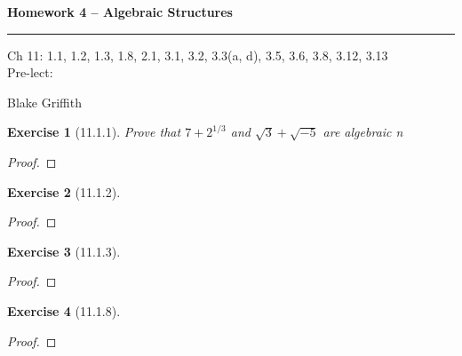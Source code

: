 \documentclass[12pt]{article}
\newtheorem*{exer}{Exercise}
\begin{document}
\textbf{Homework 4 -- Algebraic Structures} \\

\hrule

\begin{minipage}{.80\linewidth}
    \flushleft
    Ch 11: 1.1, 1.2, 1.3, 1.8, 2.1, 3.1, 3.2, 3.3(a, d), 3.5, 3.6, 3.8,
    3.12, 3.13 \\
    Pre-lect:  \\
\end{minipage}
\begin{minipage}{.20\linewidth}
    \flushright
    Blake Griffith
\end{minipage}


\begin{exer}[11.1.1]

    Prove that $7 + 2^{1/3}$ and $\sqrt{3} + \sqrt{-5}$ are algebraic n
\end{exer}

\begin{proof}
\end{proof}


\begin{exer}[11.1.2]
\end{exer}

\begin{proof}
\end{proof}


\begin{exer}[11.1.3]
\end{exer}

\begin{proof}
\end{proof}


\begin{exer}[11.1.8]
\end{exer}

\begin{proof}
\end{proof}
\end{document}
